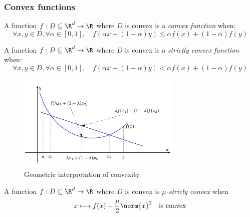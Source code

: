 \documentclass{../cs-classes/cs-classes}
\begin{document}
\subsubsection{Convex functions}
\begin{definition}
    A function $f:D\subseteq\R^d\to\R$ where $D$ is convex is a \emph{convex function} when:
    \begin{equation}
        \forall x, y \in D, \forall \alpha\in[0, 1], \quad f(\alpha x+(1-\alpha)y)\leq\alpha f(x) + (1-\alpha)f(y)
    \end{equation}
\end{definition}

\begin{definition}
    A function $f:D\subseteq\R^d\to\R$ where $D$ is convex is a \emph{strictly convex function} when:
    \begin{equation}
        \forall x, y \in D, \forall \alpha\in[0, 1], \quad f(\alpha x+(1-\alpha)y)<\alpha f(x) + (1-\alpha)f(y)
    \end{equation}
\end{definition}

\vspace*{-0.5cm}
\begin{figure}[H]
    \centering
    \captionsetup{justification=centering}
    \includegraphics[width=0.7\textwidth]{images/convexity.jpg}
    \caption{Geometric interpretation of convexity}
\end{figure}

\begin{definition}
    A function $f:D\subseteq\R^d\to\R$ where $D$ is convex is \emph{$\mu$-stricly convex} when 
    \begin{equation*}
        x\longmapsto f(x)-\frac{\mu}{2}\norm{x}^2 \quad\textnormal{is convex}
    \end{equation*}
\end{definition}
\end{document}
